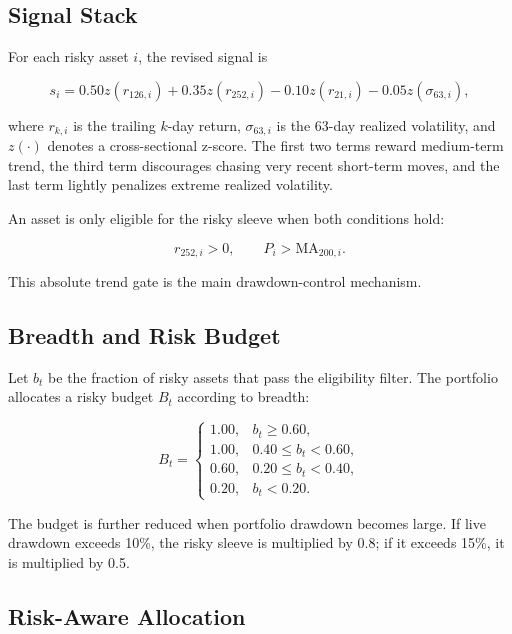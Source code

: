 \documentclass[11pt]{article}
\begin{document}
\subsection{Signal Stack}

For each risky asset $i$, the revised signal is

\begin{equation}
s_i = 0.50 z(r_{126,i}) + 0.35 z(r_{252,i}) - 0.10 z(r_{21,i}) - 0.05 z(\sigma_{63,i}),
\end{equation}

where $r_{k,i}$ is the trailing $k$-day return, $\sigma_{63,i}$ is the 63-day realized volatility, and $z(\cdot)$ denotes a cross-sectional z-score. The first two terms reward medium-term trend, the third term discourages chasing very recent short-term moves, and the last term lightly penalizes extreme realized volatility.

An asset is only eligible for the risky sleeve when both conditions hold:

\begin{equation}
r_{252,i} > 0, \qquad P_i > \text{MA}_{200,i}.
\end{equation}

This absolute trend gate is the main drawdown-control mechanism.

\subsection{Breadth and Risk Budget}

Let $b_t$ be the fraction of risky assets that pass the eligibility filter. The portfolio allocates a risky budget $B_t$ according to breadth:

\begin{equation}
B_t =
\begin{cases}
1.00, & b_t \ge 0.60, \\
1.00, & 0.40 \le b_t < 0.60, \\
0.60, & 0.20 \le b_t < 0.40, \\
0.20, & b_t < 0.20.
\end{cases}
\end{equation}

The budget is further reduced when portfolio drawdown becomes large. If live drawdown exceeds 10\%, the risky sleeve is multiplied by 0.8; if it exceeds 15\%, it is multiplied by 0.5.

\subsection{Risk-Aware Allocation}
\end{document}
